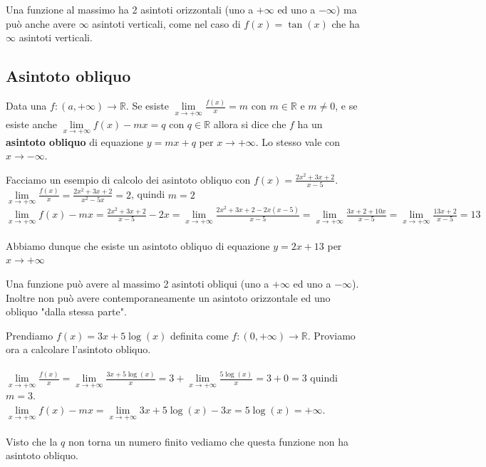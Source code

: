 \begin{observation}
Una funzione al massimo ha 2 asintoti orizzontali (uno a $+\infty$ ed uno a $-\infty$) ma può anche avere $\infty$ asintoti verticali, come nel caso di $f(x) = \tan(x)$ che ha $\infty$ asintoti verticali.
\end{observation}

\subsection{Asintoto obliquo}
\begin{definition}
    Data una $f:(a, +\infty) \to \mathbb{R}$. Se esiste $\lim\limits_{x\to +\infty}\frac{f(x)}{x} = m$ con $m \in \mathbb{R}$ e $m\neq 0$, e se esiste anche $\lim\limits_{x\to +\infty}f(x) - mx = q$ con $q \in \mathbb{R}$ allora si dice che $f$ ha un \textbf{asintoto obliquo} di equazione $y = mx + q$ per $x\to +\infty$. Lo stesso vale con $x \to -\infty$.
\end{definition}

\begin{example}
Facciamo un esempio di calcolo dei asintoto obliquo con $f(x) = \frac{2x^2 + 3x +2}{x-5}$.\\
$\lim\limits_{x\to +\infty}\frac{f(x)}{x} = \frac{2x^2 + 3x +2}{x^2-5x} = 2$, quindi $m=2$\\
$\lim\limits_{x\to +\infty}f(x) - mx = \frac{2x^2 + 3x +2}{x-5} - 2x = \lim\limits_{x\to +\infty}\frac{2x^2 + 3x +2 - 2x(x-5)}{x-5} = \lim\limits_{x\to +\infty} \frac{3x + 2 + 10x}{x-5} = \lim\limits_{x\to +\infty}\frac{13x + 2}{x-5} = 13$\\\\
Abbiamo dunque che esiste un asintoto obliquo di equazione $y=2x +13$ per $x\to +\infty$
\end{example}

\begin{observation}
Una funzione può avere al massimo 2 asintoti obliqui (uno a $+\infty$ ed uno a $-\infty$). Inoltre non può avere contemporaneamente un asintoto orizzontale ed uno obliquo "dalla stessa parte".
\end{observation}

\begin{example}
Prendiamo $f(x) = 3x + 5\log(x)$ definita come $f: (0,+\infty) \to \mathbb{R}$. Proviamo ora a calcolare l'asintoto obliquo.\\\\
$\lim\limits_{x\to +\infty}\frac{f(x)}{x} = \lim\limits_{x\to +\infty} \frac{3x + 5\log(x)}{x} = 3 + \lim\limits_{x\to +\infty}\frac{5\log(x)}{x} = 3 + 0 = 3$ quindi $m=3$.\\
$\lim\limits_{x\to +\infty}f(x) - mx = \lim\limits_{x\to +\infty} 3x + 5\log(x) -3x = 5\log(x) = +\infty$.\\\\
Visto che la $q$ non torna un numero finito vediamo che questa funzione non ha asintoto obliquo.
\end{example}